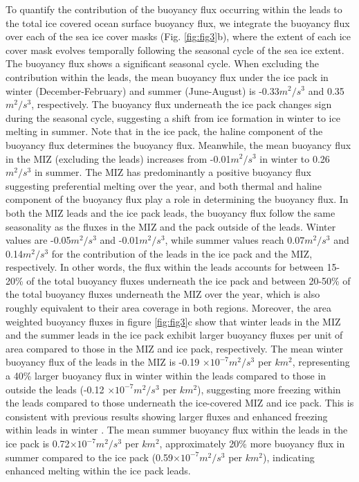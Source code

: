 \documentclass[lineno,sn-basic]{sn-jnl}%
\begin{document}
To quantify the contribution of the buoyancy flux occurring within the leads to the total ice covered ocean surface buoyancy flux, we integrate the buoyancy flux over each of the sea ice cover masks (Fig. \ref{fig:fig3}b), where the extent of each ice cover mask evolves temporally following the seasonal cycle of the sea ice extent. The buoyancy flux shows a significant seasonal cycle.
When excluding the contribution within the leads, the mean buoyancy flux under the ice pack in winter (December-February) and summer (June-August) is -0.33$m^2/s^3$  and 0.35$m^2/s^3$, respectively. The buoyancy flux underneath the ice pack changes sign during the seasonal cycle, suggesting a shift from ice formation in winter to ice melting in summer. Note that in the ice pack, the haline component of the buoyancy flux determines the buoyancy flux. Meanwhile, the mean buoyancy flux in the MIZ (excluding the leads) increases from -0.01$m^2/s^3$ in winter to 0.26$m^2/s^3$ in summer. The MIZ has predominantly a positive buoyancy flux suggesting preferential melting over the year, and both thermal and haline component of the buoyancy flux play a role in determining the buoyancy flux. In both the MIZ leads and the ice pack leads, the buoyancy flux follow the same seasonality as the fluxes in the MIZ and the pack outside of the leads. Winter values are -0.05$m^2/s^3$ and -0.01$m^2/s^3$, while summer values reach 0.07$m^2/s^3$ and 0.14$m^2/s^3$ for the contribution of the leads in the ice pack and the MIZ, respectively.
In other words, the flux within the leads accounts for between 15-20\% of the total buoyancy fluxes underneath the ice pack and between 20-50\% of the total buoyancy fluxes underneath the MIZ over the year, which is also roughly equivalent to their area coverage in both regions.
Moreover, the area weighted buoyancy fluxes in figure \ref{fig:fig3}c show that winter leads in the MIZ and the summer leads in the ice pack exhibit larger buoyancy fluxes per unit of area compared to those in the MIZ and ice pack, respectively. 
The mean winter buoyancy flux of the leads in the MIZ is 
-0.19 $\times10^{-7} m^2/s^3$ per $km^2$, representing a 40\% larger buoyancy flux in winter within the leads compared to those in outside the leads (-0.12 $\times10^{-7} m^2/s^3$ per $km^2$), suggesting more freezing within the leads compared to those underneath the ice-covered MIZ and ice pack. This is consistent with previous results showing larger fluxes and enhanced freezing within leads in winter \citep{Boutin_rheology_2023}. 
The mean summer buoyancy flux within the leads in the ice pack is 0.72$\times10^{-7} m^2/s^3$ per $km^2$, approximately 20\% more buoyancy flux in summer compared to the ice pack (0.59$\times10^{-7} m^2/s^3$ per $km^2$), indicating enhanced melting within the ice pack leads. 
\end{document}
